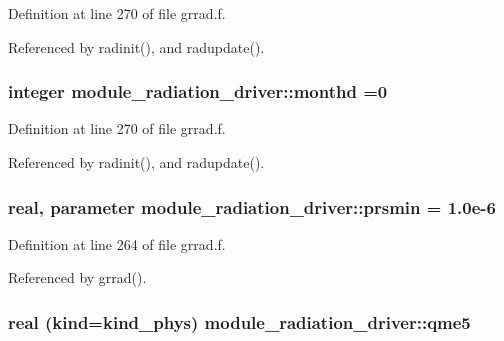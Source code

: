 Definition at line 270 of file grrad.\+f.



Referenced by radinit(), and radupdate().

\subsubsection[{\texorpdfstring{monthd}{monthd}}]{\setlength{\rightskip}{0pt plus 5cm}integer module\+\_\+radiation\+\_\+driver\+::monthd =0\hspace{0.3cm}{\ttfamily [private]}}\hypertarget{group__module__radiation__driver_gac4baf8ff048aaa5b85d03cc42c579c7b}{}\label{group__module__radiation__driver_gac4baf8ff048aaa5b85d03cc42c579c7b}


Definition at line 270 of file grrad.\+f.



Referenced by radinit(), and radupdate().

\subsubsection[{\texorpdfstring{prsmin}{prsmin}}]{\setlength{\rightskip}{0pt plus 5cm}real, parameter module\+\_\+radiation\+\_\+driver\+::prsmin = 1.\+0e-\/6\hspace{0.3cm}{\ttfamily [private]}}\hypertarget{group__module__radiation__driver_ga3fc43ca0d2c5f69a380ddb4f0926ecc7}{}\label{group__module__radiation__driver_ga3fc43ca0d2c5f69a380ddb4f0926ecc7}


Definition at line 264 of file grrad.\+f.



Referenced by grrad().

\subsubsection[{\texorpdfstring{qme5}{qme5}}]{\setlength{\rightskip}{0pt plus 5cm}real (kind=kind\+\_\+phys) module\+\_\+radiation\+\_\+driver\+::qme5\hspace{0.3cm}{\ttfamily [private]}}\hypertarget{group__module__radiation__driver_gab671cb80142c71dab5f41f01ccdcc088}{}\label{group__module__radiation__driver_gab671cb80142c71dab5f41f01ccdcc088}



